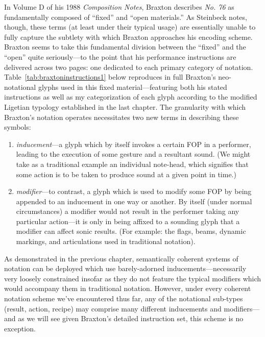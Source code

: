         In Volume D of his 1988 \textit{Composition Notes}, Braxton describes \textit{No. 76} as fundamentally composed of ``fixed'' and ``open materials.'' As Steinbeck notes, though, these terms (at least under their typical usage) are essentially unable to fully capture the subtlety with which Braxton approaches his encoding scheme.\autocite[254]{Steinbeck_2018} Braxton seems to take this fundamental division between the ``fixed'' and the ``open'' quite seriously---to the point that his performance instructions are delivered across two pages: one dedicated to each primary category of notation. Table~\ref{tab:braxtoninstructions1} below reproduces in full Braxton's neo-notational glyphs used in this fixed material---featuring both his stated instructions as well as my categorization of each glyph according to the modified Ligetian typology established in the last chapter. The granularity with which Braxton's notation operates necessitates two new terms in describing these symbols: 
        
            \begin{smallquote}
                \begin{enumerate}
                    \item \textit{inducement}---a glyph which by itself invokes a certain FOP in a performer, leading to the execution of some gesture and a resultant sound. (We might take as a traditional example an individual note-head, which signifies that some action is to be taken to produce sound at a given point in time.)
                    \item \textit{modifier}---to contrast, a glyph which is used to modify some FOP by being appended to an inducement in one way or another. By itself (under normal circumstances) a modifier would not result in the performer taking any particular action---it is only in being affixed to a sounding glyph that a modifier can affect sonic results. (For example: the flags, beams, dynamic markings, and articulations used in traditional notation).
                \end{enumerate}
            \end{smallquote}
        
        As demonstrated in the previous chapter, semantically coherent systems of notation can be deployed which use barely-adorned inducements---necessarily very loosely constrained insofar as they do not feature the typical modifiers which would accompany them in traditional notation. However, under every coherent notation scheme we've encountered thus far, any of the notational sub-types (result, action, recipe) may comprise many different inducements and modifiers---and as we will see given Braxton's detailed instruction set, this scheme is no exception.

